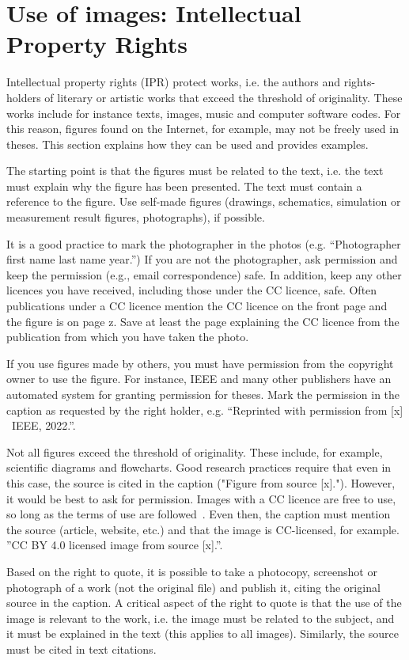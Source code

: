 \section{Use of images: Intellectual Property Rights}
\label{copyright}
Intellectual property rights (IPR) protect works, i.e. the authors
and rights-holders of literary or artistic works that exceed the
threshold of originality. These works include for instance texts,
images, music and computer software codes. For this reason, figures
found on the Internet, for example, may not be freely used in theses.
This section explains how they can be used and provides examples.

The starting point is that the figures must be related to the text,
i.e. the text must explain why the figure has been presented. The
text must contain a reference to the figure. Use self-made figures
(drawings, schematics, simulation or measurement result figures,
photographs), if possible.

It is a good practice to mark the photographer in the photos (e.g.
“Photographer first name last name year.”) If you are not the
photographer, ask permission and keep the permission (e.g., email
correspondence) safe. In addition, keep any other licences you have
received, including those under the CC licence, safe. Often
publications under a CC licence mention the CC licence on the front
page and the figure is on page z. Save at least the page explaining
the CC licence
from the publication from which you have taken the photo.

If you use figures made by others, you must have permission from the
copyright owner to use the figure. For instance, IEEE and many other
publishers have an automated system for granting permission for
theses. Mark the permission in the caption as requested by the right
holder, e.g. “Reprinted with permission from [x] \textcopyright\ IEEE, 2022.”.

Not all figures exceed the threshold of originality. These include,
for example, scientific diagrams and flowcharts. Good research
practices require that even in this case, the source is cited in the
caption ("Figure from source [x]."). However, it would be best to ask
for permission. Images with a CC licence are free to use, so long as
the terms of use are followed~\cite{about_cc_licenses}. Even then,
the caption must mention the source (article, website, etc.) and that
the image is CC-licensed, for example. ”CC BY 4.0 licensed image from
source [x].”.

Based on the right to quote, it is possible to take a photocopy,
screenshot or photograph of a work (not the original file) and
publish it, citing the original source in the caption. A critical
aspect of the right to quote is that the use of the image is relevant
to the work, i.e. the image must be related to the subject, and it
must be explained in the text (this applies to all images).
Similarly, the source must be cited in text citations.

